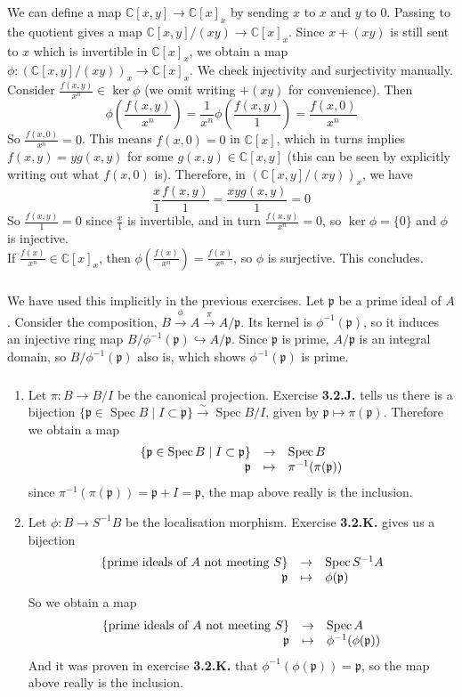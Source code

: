 \documentclass{article}
\newcommand{\C}{\mathbb{C}}
\DeclareMathOperator{\Spec}{Spec}
\newcommand{\applic}[4]{\begin{array}[t]{rcl}
#1 & \to & #2 \\
#3 & \mapsto & #4
\end{array}}
\newcommand{\p}{\mathfrak{p}}
\newcommand{\exercise}{\subsubsection} %
\begin{document}
\exercise{} We can define a map $\C[x,y] \to \C[x]_x$ by sending $x$ to $x$ and $y$ to $0$. Passing to the quotient gives a map $\C[x,y]/(xy) \to \C[x]_x$. Since $x + (xy)$ is still sent to $x$ which is invertible in $\C[x]_x$, we obtain a map $\phi : (\C[x,y]/(xy))_x \to \C[x]_x$. We check injectivity and surjectivity manually. Consider $\frac{f(x,y)}{x^n} \in \ker \phi$ (we omit writing $+(xy)$ for convenience). Then
\[\phi \left(\frac{f(x,y)}{x^n}\right) = \frac{1}{x^n} \phi \left(\frac{f(x,y)}{1}\right) = \frac{f(x,0)}{x^n}\]
So $\frac{f(x,0)}{x^n} = 0$. This means $f(x,0) = 0$ in $\C[x]$, which in turns implies $f(x,y) = yg(x,y)$ for some $g(x,y) \in \C[x,y]$ (this can be seen by explicitly writing out what $f(x,0)$ is). Therefore, in $(\C[x,y]/(xy))_x$, we have
\[\frac{x}{1} \frac{f(x,y)}{1} = \frac{xyg(x,y)}{1} = 0\]
So $\frac{f(x,y)}{1} = 0$ since $\frac{x}{1}$ is invertible, and in turn $\frac{f(x,y)}{x^n} = 0$, so $\ker \phi = \{0\}$ and $\phi$ is injective. \\
If $\frac{f(x)}{x^n} \in \C[x]_x$, then $\phi(\frac{f(x)}{x^n}) = \frac{f(x)}{x^n}$, so $\phi$ is surjective. This concludes.

\exercise{} We have used this implicitly in the previous exercises. Let $\p$ be a prime ideal of $A$. Consider the composition, $B \xrightarrow{\phi} A \xrightarrow{\pi} A/\p$. Its kernel is $\phi^{-1}(\p)$, so it induces an injective ring map $B/\phi^{-1}(\p) \hookrightarrow A/\p$. Since $\p$ is prime, $A/\p$ is an integral domain, so $B/\phi^{-1}(\p)$ also is, which shows $\phi^{-1}(\p)$ is prime.

\exercise{} \label{inclus_spec_quotient} \begin{enumerate}
    \item Let $\pi : B \to B/I$ be the canonical projection. Exercise \textbf{3.2.J.} tells us there is a bijection $\{\p \in \Spec B \mid I \subset \p\} \xrightarrow{\sim} \Spec B/I$, given by $\p \mapsto \pi(\p)$. Therefore we obtain a map
    \[\applic{\{\p \in \Spec B \mid I \subset \p\}}{\Spec B}{\p}{\pi^{-1}(\pi(\p))}\]
    since $\pi^{-1}(\pi(\p)) = \p + I = \p$, the map above really is the inclusion.
    \item Let $\phi : B \to S^{-1}B$ be the localisation morphism. Exercise \textbf{3.2.K.} gives us a bijection
    \[\applic{\{\text{prime ideals of $A$ not meeting $S$}\}}{\Spec S^{-1}A}{\p}{\phi (\p)}\]
    So we obtain a map
    \[\applic{\{\text{prime ideals of $A$ not meeting $S$}\}}{\Spec A}{\p}{\phi^{-1}(\phi (\p))}\]
    And it was proven in exercise \textbf{3.2.K.} that $\phi^{-1}(\phi (\p)) = \p$, so the map above really is the inclusion.
\end{enumerate}
\end{document}
